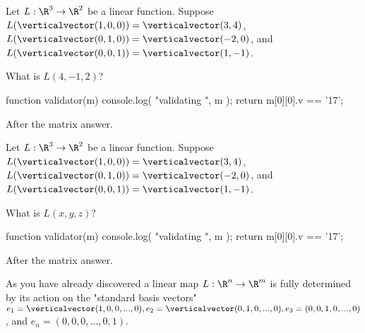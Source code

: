\documentclass{ximera}
\begin{document}
\begin{question}
  Let $L:\R^3 \to \R^2$ be a linear function.  Suppose $L(\verticalvector(1,0,0)) = \verticalvector(3,4)$, 
  $L(\verticalvector(0,1,0)) = \verticalvector(-2,0)$,  and  $L(\verticalvector(0,0,1)) = \verticalvector(1,-1)$.
  
  \begin{solution}
    What is $L (4,-1,2)$?

    \begin{matrix-answer}[name=M]
      function validator(m) {
        console.log( "validating ", m );
        return m[0][0].v == '17';
      }
    \end{matrix-answer}
    
    After the matrix answer.
  \end{solution}
\end{question}


\begin{question}
  Let $L:\R^3 \to \R^2$ be a linear function.  Suppose $L(\verticalvector(1,0,0)) = \verticalvector(3,4)$, 
  $L(\verticalvector(0,1,0)) = \verticalvector(-2,0)$,  and  $L(\verticalvector(0,0,1)) = \verticalvector(1,-1)$.
  
  \begin{solution}
    What is $L(x,y,z)$?

    \begin{matrix-answer}[name=M]
      function validator(m) {
        console.log( "validating ", m );
        return m[0][0].v == '17';
      }
    \end{matrix-answer}
    
    After the matrix answer.
  \end{solution}

\end{question}

As you have already discovered a linear map $L: \R^n \to \R^m$ is
fully determined by its action on the "standard basis vectors" $e_1 =
\verticalvector(1,0,0,...,0), e_2 = \verticalvector(0,1,0,...,0), e_3
= (0,0,1,0,...,0)$, and $e_n = (0,0,0,...,0,1)$.
\end{document}

